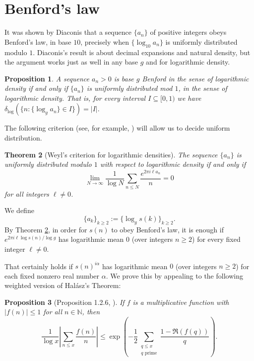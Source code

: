 \documentclass[11pt, reqno]{amsart}
\newtheorem{theorem}{Theorem}
\newtheorem{proposition}[theorem]{Proposition}
\theoremstyle{remark}
\numberwithin{theorem}{section}
\numberwithin{proposition}{section}
\numberwithin{lemma}{section}
\numberwithin{corollary}{section}
\numberwithin{equation}{section}
\numberwithin{conjecture}{section}
\numberwithin{definition}{section}
\begin{document}
\section{Benford's law}\label{sec:Benford}

It was shown by Diaconis \cite[Theorem 1]{diaconis77} that a sequence $\{a_n\}$ of positive integers obeys Benford's law, in base $10$, precisely when $\{\log_{10} a_n\}$ is uniformly distributed modulo $1$. Diaconis's result is about decimal expansions and natural density, but the argument works just as well in any base $g$ and for logarithmic density.

\begin{proposition} A sequence $a_n > 0$ is base $g$ Benford in the sense of logarithmic density if and only if $\{a_n\}$ is uniformly distributed mod $1$, in the sense of logarithmic density. That is, for every interval $I \subseteq [0, 1)$ we have $\delta_{\log}(\{n : \{\log_{g} a_n\} \in I\}) = |I|.$    
\end{proposition}



 The following criterion (see, for example, \cite[p. 209]{gonggulupollack}) will allow us to decide uniform distribution.
    
	\begin{theorem}[Weyl's criterion for logarithmic densities]\label{thm:Weylscrit}
 The sequence $\{a_n\}$ is uniformly distributed modulo $1$ with respect to logarithmic density 
if and only if 
$$\lim_{N\to \infty}\frac{1}{\log N}\sum_{n\leq N}\frac{e^{2\pi i \ell a_n}}{n}=0$$ for all integers $\ell\neq  0$.
	\end{theorem}
	
We define $$\{a_k\}_{k\geq 2}:=\{\log_{g} s(k)\}_{k\geq 2}.$$
	By Theorem \ref{thm:Weylscrit}, in order for $s(n)$ to obey Benford's law, it is enough if $e^{2\pi i \ell \log s(n)/\log g} $
has logarithmic mean $0$ (over integers $n\geq 2$) for every fixed integer $\ell\neq 0$. 

That certainly holds if $s(n)^{i\alpha}$ has logarithmic mean  $0$ (over integers $n\geq 2$) for each fixed nonzero real number $\alpha$. We  prove this by appealing to the following weighted version of Hal\'{a}sz's Theorem:

	\begin{proposition}[Proposition 1.2.6, \cite{GranvilleSoundararajan}]\label{Prop GS}
    If $f$ is a multiplicative function with $|f(n)| \leq 1$ for all $n\in\mathbb{N}$, then
\[\frac{1}{\log x}\left|\sum_{n\leq x}\frac{f(n)}{n}\right|\leq\exp\left(-\frac12\sum_{\substack{q\leq x\\q\text{ prime}}}\frac{1-\Re\left(f(q)\right)}{q}\right).\]
	\end{proposition}
	
\end{document}
